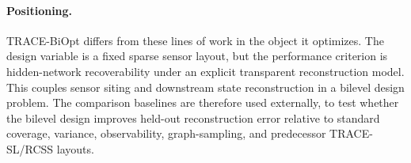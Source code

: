 \paragraph{Positioning.}
TRACE-BiOpt differs from these lines of work in the object it optimizes.
The design variable is a fixed sparse sensor layout, but the performance
criterion is hidden-network recoverability under an explicit transparent
reconstruction model.  This couples sensor siting and downstream state
reconstruction in a bilevel design problem.  The comparison baselines are
therefore used externally, to test whether the bilevel design improves
held-out reconstruction error relative to standard coverage, variance,
observability, graph-sampling, and predecessor TRACE-SL/RCSS layouts.

